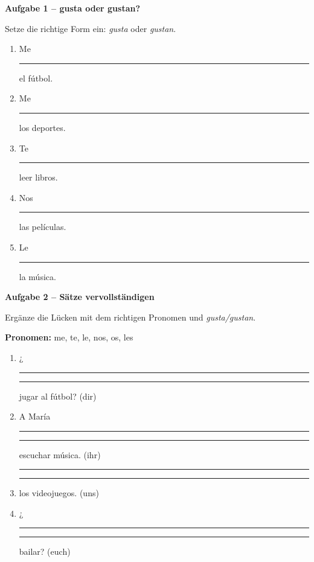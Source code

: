 \documentclass[11pt, a4paper]{article}
\newcommand{\fachfarbe}{spanisch}
\newcommand{\punktebox}[1]{\hfill\fbox{\small \_/#1}}
\newcommand{\luecke}[1]{\rule{#1}{0.4pt}}
\newenvironment{aufgabe}[1]{%
    \needspace{5\baselineskip}%
    \nopagebreak[4]%
    \vspace{10pt}
    \noindent\textbf{\textcolor{\fachfarbe}{Aufgabe #1}}
    \nopagebreak[4]%
    \vspace{5pt}
    \nopagebreak[4]%
    \begin{list}{}{\leftmargin=0pt}
    \item[]
}{%
    \end{list}
}
\begin{document}
\vspace{10pt}


\begin{aufgabe}{1 -- gusta oder gustan?}
Setze die richtige Form ein: \textit{gusta} oder \textit{gustan}. \punktebox{5}
\end{aufgabe}

\begin{enumerate}[label=\alph*)]
    \item Me \luecke{2cm} el fútbol.
    \item Me \luecke{2cm} los deportes.
    \item Te \luecke{2cm} leer libros.
    \item Nos \luecke{2cm} las películas.
    \item Le \luecke{2cm} la música.
\end{enumerate}

\vspace{15pt}


\begin{aufgabe}{2 -- Sätze vervollständigen}
Ergänze die Lücken mit dem richtigen Pronomen und \textit{gusta/gustan}. \punktebox{4}
\end{aufgabe}

\begin{hinweis}
\textbf{Pronomen:} me, te, le, nos, os, les
\end{hinweis}

\vspace{0.5em}

\begin{enumerate}[label=\alph*)]
    \item ¿\luecke{1.5cm} \luecke{2cm} jugar al fútbol? (dir)
    \item A María \luecke{1.5cm} \luecke{2cm} escuchar música. (ihr)
    \item \luecke{1.5cm} \luecke{2cm} los videojuegos. (uns)
    \item ¿\luecke{1.5cm} \luecke{2cm} bailar? (euch)
\end{enumerate}

\vspace{15pt}
\end{document}
